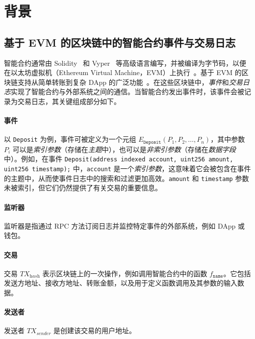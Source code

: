 \section{背景}\label{sec:Background}

\subsection{基于 EVM 的区块链中的智能合约事件与交易日志}
智能合约通常由 Solidity~\cite{Solidity} 和 Vyper~\cite{Vyper} 等高级语言编写，并被编译为字节码，以便在以太坊虚拟机（Ethereum Virtual Machine，EVM）上执行~\cite{EVM}。基于 EVM 的区块链支持从简单转账到复杂 DApp 的广泛功能~\cite{DApp}。在这些区块链中，\textit{事件}和\textit{交易日志}实现了智能合约与外部系统之间的通信。当智能合约发出事件时，该事件会被记录为交易日志，其关键组成部分如下。

\paragraph{事件}
以 \texttt{Deposit} 为例，事件可被定义为一个元组 $E_{\texttt{Deposit}}(P_1, P_2, \ldots, P_n)$，其中参数 $P_i$ 可以是\textit{索引参数}（存储在\textit{主题}中），也可以是\textit{非索引参数}（存储在\textit{数据字段}中）。例如，在事件
\texttt{Deposit(address indexed account, uint256 amount, uint256 timestamp);}
中，\texttt{account} 是一个\textit{索引参数}，这意味着它会被包含在事件的主题中，从而使事件日志中的搜索和过滤更加高效。\texttt{amount} 和 \texttt{timestamp} 参数未被索引，但它们仍然提供了有关交易的重要信息。


\paragraph{监听器}
监听器是指通过 RPC 方法订阅日志并监控特定事件的外部系统，例如 DApp 或钱包。

\paragraph{交易}
交易 $TX_{\textit{hash}}$ 表示区块链上的一次操作，例如调用智能合约中的函数 $f_{\texttt{name}}$。它包括发送方地址、接收方地址、转账金额，以及用于定义函数调用及其参数的输入数据。


\paragraph{发送者}
发送者 \( TX_{\textit{sender}} \) 是创建该交易的用户地址。

